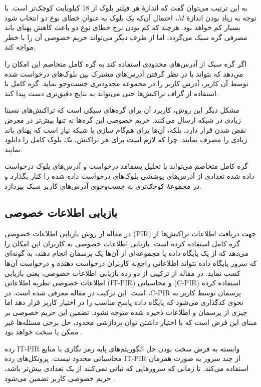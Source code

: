 به این ترتیب می‌توان گفت که اندازهٔ هر فیلتر بلوک از $18$ کیلوبایت کوچک‌تر است. با توجه به زیاد بودن اندازهٔ $M$، احتمال آن‌که یک بلوک به عنوان خطای نوع دو انتخاب شود بسیار کم خواهد بود. هرچند که کم بودن نرخ خطای نوع دو باعث کاهش پهنای باند مصرفی گره سبک می‌گردد، اما از طرف دیگر می‌تواند حریم خصوصی آن را با خطر مواجه کند.

اگر گره سبک از آدرس‌های محدودی استفاده کند به گره کامل متخاصم این امکان را می‌دهد که بتواند با در نظر گرفتن آدرس‌های مشترک بین بلوک‌های درخواست شده توسط آن کاربر، آدرس کاربر را در مجموعه محدود‌تری جست‌وجو نماید. گره کامل با استفاده از گراف تراکنش‌ها حتی می‌تواند به نتایج دقیق‌تری دست پیدا کند\cite{blockfilter-wiki}.

مشکل دیگر این روش، کاربرد آن برای گره‌های سبکی است که تراکنش‌های نسبتا زیادی در شبکه ارسال می‌کنند. حریم خصوصی این گره‌ها نه تنها بیش‌تر در معرض نقض شدن قرار دارد، بلکه، آن‌ها برای هم‌گام سازی با شبکه نیاز است که پهنای باند زیادی را مصرف نمایند. چرا که لازم است برای هر تراکنش، یک بلوک کامل را دانلود نمایند.

گره کامل متخاصم می‌تواند با تحلیل‌ بسمامد درخواست و آدرس‌های بلوک درخواست داده شده تعدادی از آدرس‌های پوششی بلوک‌های درخواست داده شده را کنار بگذارد و در مجموعهٔ کوچک‌تری به جست‌و‌جوی آدرس‌‌های کاربر سبک بپردازد.

\subsection{بازیابی اطلاعات خصوصی}
\label{PIR}
در مقاله \cite{Qin2019} از روش بازیابی اطلاعات خصوصی (PIR) جهت دریافت اطلاعات تراکنش‌ها از گره‌ کامل استفاده کرده است. بازیابی اطلاعات خصوصی به کاربران این امکان را می‌دهد که از یک پایگاه داده یا مجموعه‌ای از آن‌ها یک پرسمان انجام دهند، به گونه‌ای که سرور پایگاه داده نتواند اطلاعاتی راجع‌به کاربران درخواست دهنده و درخواست آن‌ها کسب نماید. در مقاله \cite{Qin2019}  از ترکیبی از دو رده بازیابی اطلاعات خصوصی، یعنی بازیابی اطلاعات خصوصی نظریه اطلاعاتی (IT-PIR) و محاسباتی (C-PIR) استفاده کرده است. این ترکیب در مقاله \cite{Devet2014} معرفی شده است. در ،C-PIR پرسمان توسط کاربر به نحوی کدگذاری می‌شود که پایگاه داده پاسخ مناسب را در اختیار کاربر قرار دهد اما چیزی از پرسمان و اطلاعات ذخیره شده متوجه نشود. تضمین این حریم خصوصی بر مبنای این فرض است که با اختیار داشتن توان پردازشی محدود، حل برخی مسئله‌ها  غیر ممکن یا سخت خواهد بود \cite{Devet2014}.

رده IT-PIR وابسته به فرض سخت بودن حل الگوریتم‌های پایه رمز نگاری با منابع محاسباتی محدود نیست. پروتکل‌های رده IT-PIR از چند سرور به صورت همزمان استفاده می‌کند. تا زمانی که سرورهایی که تبانی نمی‌کنند از یک تعدادی بیش‌تر باشد، حریم خصوصی کاربر تضمین می‌شود \cite{Devet2014}. 

